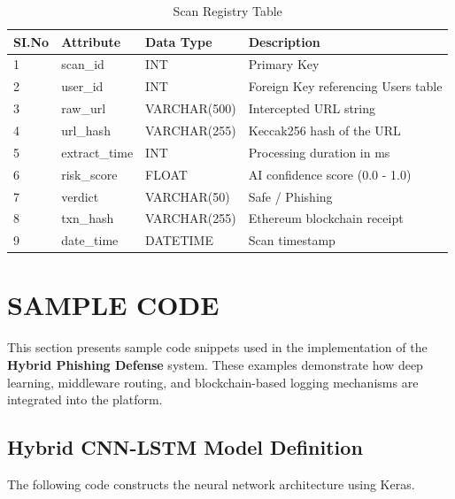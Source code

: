 \begin{table}[h]
\centering
\renewcommand{\arraystretch}{1.5}
\begin{tabular}{|p{}|p{}|p{}|p{}|}
\hline
\textbf{SI.No} & \textbf{Attribute} & \textbf{Data Type} & \textbf{Description} \\
\hline
1 & scan\_id & INT & Primary Key \\
\hline
2 & user\_id & INT & Foreign Key referencing Users table \\
\hline
3 & raw\_url & VARCHAR(500) & Intercepted URL string \\
\hline
4 & url\_hash & VARCHAR(255) & Keccak256 hash of the URL \\
\hline
5 & extract\_time & INT & Processing duration in ms \\
\hline
6 & risk\_score & FLOAT & AI confidence score (0.0 - 1.0) \\
\hline
7 & verdict & VARCHAR(50) & Safe / Phishing \\
\hline
8 & txn\_hash & VARCHAR(255) & Ethereum blockchain receipt \\
\hline
9 & date\_time & DATETIME & Scan timestamp \\
\hline
\end{tabular}
\captionsetup{justification=centering}
\caption{Scan Registry Table}
\end{table}

\clearpage

\section{SAMPLE CODE}

This section presents sample code snippets used in the implementation of the \textbf{Hybrid Phishing Defense} system. These examples demonstrate how deep learning, middleware routing, and blockchain-based logging mechanisms are integrated into the platform.

\subsection{Hybrid CNN-LSTM Model Definition}

The following code constructs the neural network architecture using Keras.

